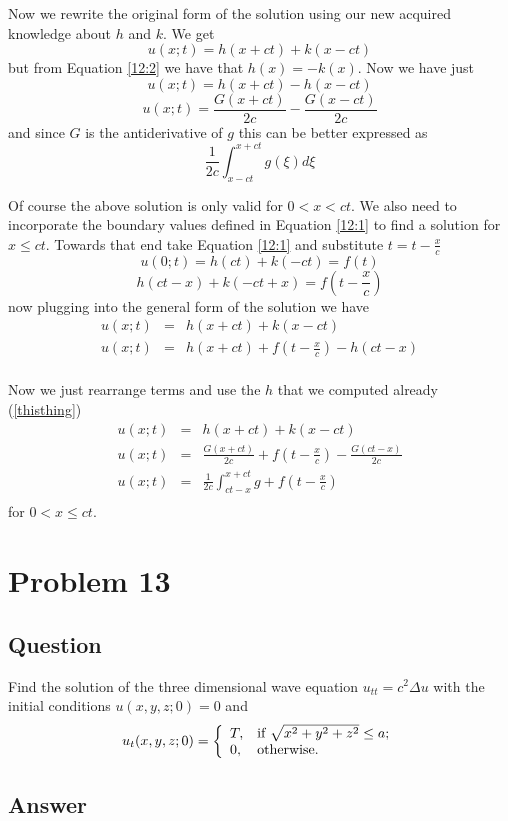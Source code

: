 \documentclass[12pt]{article}
\begin{document}
Now we rewrite the original form of the solution using our new acquired knowledge about $h$ and $k$. We get
\[u(x;t)=h(x+ c t)+k(x-c t)\]
but from Equation \ref{12:2} we have that $h(x)=-k(x)$. Now we have just
\[u(x;t)=h(x+ c t)-h(x-c t)\]
\[u(x;t)=\frac{ G(x+c t)}{2 c}-\frac{ G(x- c t )}{2 c}\]
and since $G$ is the antiderivative of $g$ this can be better expressed as
\[\frac{1}{2 c} \int_{x-c t}^{x+ c t}g(\xi) d \xi\]

Of course the above solution is only valid for $0< x < c t$. We also need to incorporate the boundary values defined in Equation \ref{12:1} to find a solution for $x \leq c t$. Towards that end take Equation \ref{12:1} and substitute $t=t-\frac{x}{c}$
\[u(0;t)=h( c t)+k(-c t) = f(t)\]
\[h( c t-x)+k(-c t+x) = f(t-\frac{x}{c})\]
now plugging into the general form of the solution we have
\begin{eqnarray*}
u(x;t) &=& h(x+ c t)+k(x-c t)\\
u(x;t) &=& h(x+ c t)+ f(t-\frac{x}{c}) - h( c t-x)\\
\end{eqnarray*}

Now we just rearrange terms and use the $h$ that we computed already (\ref{thisthing})
\begin{eqnarray*}
u(x;t) &=& h(x+ c t)+k(x-c t)\\
u(x;t) &=& \frac{ G(x+c t)}{2 c}+ f(t-\frac{x}{c}) - \frac{ G(ct - x)}{2 c}\\
u(x;t) &=& \frac{ 1}{2 c} \int_{c t -x}^{x + c t} g + f(t-\frac{x}{c})\\
\end{eqnarray*}
for $0<x \leq c t$.





\section{Problem 13}
\subsection{Question}
Find the solution of the three dimensional wave equation $u_{tt} = c^2 \Delta u$ with the initial conditions $u(x,y,z;0)=0$ and
\[u_t(x,y,z;0)= \left\{
\begin{array}{ll}
T, & $if $ \sqrt{x^2+y^2+z^2} \leq a; \\
0, & $otherwise.$
\end{array}
\right.
\]

\subsection{Answer}
\end{document}
